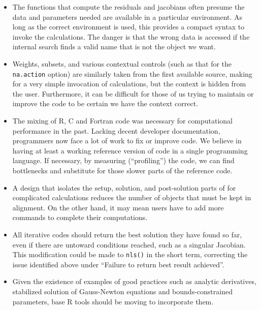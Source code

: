 \begin{itemize}
\item
  The functions that compute the residuals and jacobians often presume
  the data and parameters needed are available in a particular environment. As long
  as the correct environment is used, this provides a compact syntax to invoke the
  calculations. The danger is that the wrong data is accessed if the internal
  search finds a valid name that is not the object we want.
\item
  Weights, subsets, and various contextual controls (such as that for the
  \texttt{na.action} option) are similarly taken from the first available source,
  making for a very simple invocation of calculations, but the context is
  hidden from the user. Furthermore, it can be difficult for those of us
  trying to maintain or improve the code to be certain we have the
  context correct.
\item
  The mixing of R, C and Fortran code was necessary for computational performance
  in the past. Lacking decent developer documentation, programmers now face a
  lot of work to fix or improve code. We believe in having at least a working
  reference version of code in a single programming language. If necessary, by
  measuring (``profiling'') the code, we can find bottlenecks and substitute for
  those slower parts of the reference code.
\item
  A design that isolates the setup, solution, and post-solution parts of
  for complicated calculations reduces the number of objects that must be kept in
  alignment. On the other hand, it may mean users have to add more commands to
  complete their computations.
\item
  All iterative codes should return the best solution they have found so far,
  even if there are untoward conditions reached, such as a singular Jacobian.
  This modification could be made to \texttt{nls()} in the short term, correcting the
  issue identified above under ``Failure to return best result achieved''.
\item
  Given the existence of examples of good practices such as analytic derivatives,
  stabilized solution of Gauss-Newton equations and bounds-constrained parameters,
  base R tools should be moving to incorporate them.
\end{itemize}

